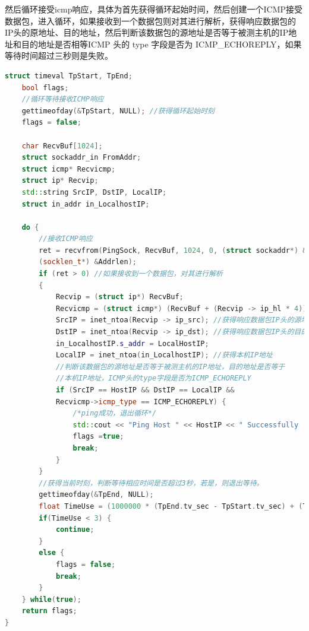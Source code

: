 \documentclass[UTF8,a4paper,10pt]{ctexart}
\begin{document}
然后循环接受icmp响应，具体为首先获得循环起始时间，然后创建一个ICMP接受数据包，进入循环，如果接收到一个数据包则对其进行解析，获得响应数据包的IP头的原地址、目的地址，然后判断该数据包的源地址是否等于被测主机的IP地址和目的地址是否相等ICMP 头的 type 字段是否为 ICMP\_ECHOREPLY，如果等待时间超过三秒则是失败。
\begin{lstlisting}[language = C++]
   struct timeval TpStart, TpEnd;
    bool flags;
    //循环等待接收ICMP响应
    gettimeofday(&TpStart, NULL); //获得循环起始时刻
    flags = false;

    char RecvBuf[1024];
    struct sockaddr_in FromAddr;
    struct icmp* Recvicmp;
    struct ip* Recvip;
    std::string SrcIP, DstIP, LocalIP;
    struct in_addr in_LocalhostIP;

    do {
        //接收ICMP响应
        ret = recvfrom(PingSock, RecvBuf, 1024, 0, (struct sockaddr*) &FromAddr,
        (socklen_t*) &Addrlen);
        if (ret > 0) //如果接收到一个数据包，对其进行解析
        {
            Recvip = (struct ip*) RecvBuf;
            Recvicmp = (struct icmp*) (RecvBuf + (Recvip -> ip_hl * 4));
            SrcIP = inet_ntoa(Recvip -> ip_src); //获得响应数据包IP头的源地址
            DstIP = inet_ntoa(Recvip -> ip_dst); //获得响应数据包IP头的目的地址
            in_LocalhostIP.s_addr = LocalHostIP;
            LocalIP = inet_ntoa(in_LocalhostIP); //获得本机IP地址
            //判断该数据包的源地址是否等于被测主机的IP地址，目的地址是否等于
            //本机IP地址，ICMP头的type字段是否为ICMP_ECHOREPLY
            if (SrcIP == HostIP && DstIP == LocalIP &&
            Recvicmp->icmp_type == ICMP_ECHOREPLY) { 
                /*ping成功，退出循环*/
                std::cout << "Ping Host " << HostIP << " Successfully !" << std::endl;
				flags =true;
				break;
            }
        }
        //获得当前时刻，判断等待相应时间是否超过3秒，若是，则退出等待。
        gettimeofday(&TpEnd, NULL);
        float TimeUse = (1000000 * (TpEnd.tv_sec - TpStart.tv_sec) + (TpEnd.tv_usec - TpStart.tv_usec)) / 1000000.0;
        if(TimeUse < 3) {
            continue; 
        }
        else {
            flags = false;
            break;
        }
    } while(true);
    return flags;
}
\end{lstlisting}
\end{document}
